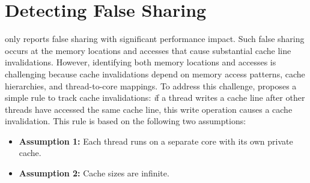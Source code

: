 \section{Detecting False Sharing}
\label{sec:detect}

\cheetah{} only reports false sharing with significant performance impact. Such false sharing occurs at the memory locations and accesses that cause substantial cache line invalidations. However, identifying both memory locations and accesses is challenging
because cache invalidations depend on memory access patterns, cache hierarchies, and thread-to-core mappings. 
To address this challenge, \cheetah{} proposes a simple rule to track cache invalidations: {\emph if a thread writes a cache line after other threads have accessed the same cache line, this write operation causes a cache invalidation}. This rule is based on the following two assumptions:
 

\begin{itemize} 
\item {\bf Assumption 1:} Each thread runs on a separate core with its own private cache. 

\item {\bf Assumption 2: } Cache sizes are infinite. 
 
\end{itemize}

